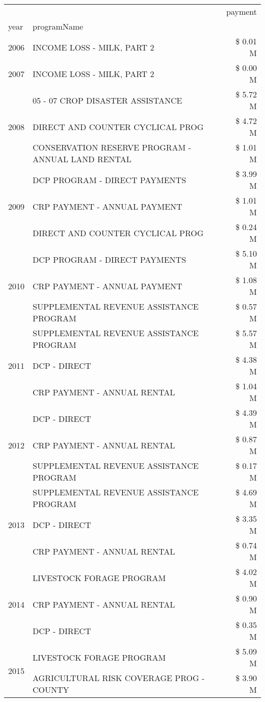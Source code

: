 \begin{tabular}{llr}
\toprule
 &  & payment \\
year & programName &  \\
\midrule
2006 & INCOME LOSS - MILK, PART 2 & \$ 0.01 M \\
\cline{1-3}
2007 & INCOME LOSS - MILK, PART 2 & \$ 0.00 M \\
\cline{1-3}
\multirow[t]{3}{*}{2008} & 05 - 07 CROP DISASTER ASSISTANCE & \$ 5.72 M \\
 & DIRECT AND COUNTER CYCLICAL PROG & \$ 4.72 M \\
 & CONSERVATION RESERVE PROGRAM - ANNUAL LAND RENTAL & \$ 1.01 M \\
\cline{1-3}
\multirow[t]{3}{*}{2009} & DCP PROGRAM - DIRECT PAYMENTS & \$ 3.99 M \\
 & CRP PAYMENT - ANNUAL PAYMENT & \$ 1.01 M \\
 & DIRECT AND COUNTER CYCLICAL PROG & \$ 0.24 M \\
\cline{1-3}
\multirow[t]{3}{*}{2010} & DCP PROGRAM - DIRECT PAYMENTS & \$ 5.10 M \\
 & CRP PAYMENT - ANNUAL PAYMENT & \$ 1.08 M \\
 & SUPPLEMENTAL REVENUE ASSISTANCE PROGRAM & \$ 0.57 M \\
\cline{1-3}
\multirow[t]{3}{*}{2011} & SUPPLEMENTAL REVENUE ASSISTANCE PROGRAM & \$ 5.57 M \\
 & DCP - DIRECT & \$ 4.38 M \\
 & CRP PAYMENT - ANNUAL RENTAL & \$ 1.04 M \\
\cline{1-3}
\multirow[t]{3}{*}{2012} & DCP - DIRECT & \$ 4.39 M \\
 & CRP PAYMENT - ANNUAL RENTAL & \$ 0.87 M \\
 & SUPPLEMENTAL REVENUE ASSISTANCE PROGRAM & \$ 0.17 M \\
\cline{1-3}
\multirow[t]{3}{*}{2013} & SUPPLEMENTAL REVENUE ASSISTANCE PROGRAM & \$ 4.69 M \\
 & DCP - DIRECT & \$ 3.35 M \\
 & CRP PAYMENT - ANNUAL RENTAL & \$ 0.74 M \\
\cline{1-3}
\multirow[t]{3}{*}{2014} & LIVESTOCK FORAGE PROGRAM & \$ 4.02 M \\
 & CRP PAYMENT - ANNUAL RENTAL & \$ 0.90 M \\
 & DCP - DIRECT & \$ 0.35 M \\
\cline{1-3}
\multirow[t]{3}{*}{2015} & LIVESTOCK FORAGE PROGRAM & \$ 5.09 M \\
 & AGRICULTURAL RISK COVERAGE PROG - COUNTY & \$ 3.90 M \\

\end{tabular}
